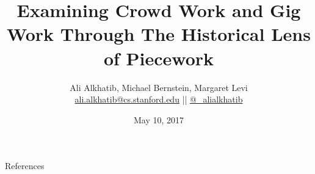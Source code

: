 \documentclass[aspectratio=169,12pt,noslidenumbers]{beamer} %
\title{Examining Crowd Work and Gig Work Through The Historical Lens of Piecework}
\author{{Ali Alkhatib}, Michael Bernstein, Margaret Levi\\
\href{mailto:ali.alkhatib@cs.stanford.edu}{ali.alkhatib@cs.stanford.edu} ||
         \href{http://twitter.com/_alialkhatib}{@\_alialkhatib}}
\institute[Stanford]{Stanford University}
\date{May 10, 2017}
\newcommand{\onlyinsubfile}[1]{#1}
\newcommand{\notinsubfile}[1]{}
\begin{document}
\renewcommand{\onlyinsubfile}[1]{}
\renewcommand{\notinsubfile}[1]{#1}

\begin{frame}
\titlepage
\end{frame}









\begin{frame}[allowframebreaks]{References}
  \printbibliography{}
\end{frame}
\end{document}
